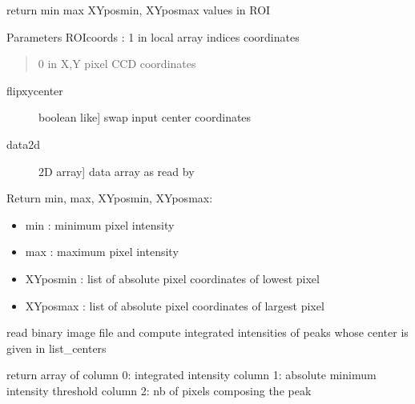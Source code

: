 \documentclass[letterpaper,10pt,english]{sphinxmanual}
\begin{document}

\begin{fulllineitems}
\label{\detokenize{PeakSearch:LaueTools.readmccd.getExtrema}}
return  min max XYposmin, XYposmax values in ROI

Parameters
ROIcoords : 1 in local array indices coordinates
\begin{quote}

0 in X,Y pixel CCD coordinates
\end{quote}
\begin{description}
\item[{flipxycenter}] \leavevmode{[}boolean like{]}
swap input center coordinates

\item[{data2d}] \leavevmode{[}2D array{]}
data array as read by {\hyperref[\detokenize{PeakSearch:LaueTools.readmccd.readCCDimage}]{}}

\end{description}

Return
min, max, XYposmin, XYposmax:
\begin{itemize}
\item {} 
min : minimum pixel intensity

\item {} 
max : maximum pixel intensity

\item {} 
XYposmin : list of absolute pixel coordinates of lowest pixel

\item {} 
XYposmax : list of absolute pixel coordinates of largest pixel

\end{itemize}

\end{fulllineitems}


\begin{fulllineitems}
\label{\detokenize{PeakSearch:LaueTools.readmccd.getIntegratedIntensities}}
read binary image file and compute integrated intensities of peaks
whose center is given in list\_centers

return
array of
column 0: integrated intensity
column 1: absolute minimum intensity threshold
column 2: nb of pixels composing the peak

\end{fulllineitems}
\end{document}
